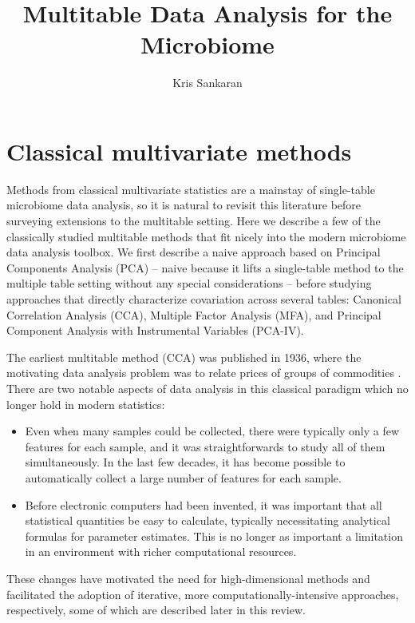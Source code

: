 \documentclass{article}
\title{Multitable Data Analysis for the Microbiome}
\author{Kris Sankaran}
\begin{document}
\maketitle

\section{Classical multivariate methods}

Methods from classical multivariate statistics are a mainstay
of single-table microbiome data analysis, so it is natural to revisit
this literature before surveying extensions to the multitable
setting. Here we describe a few of the classically studied multitable
methods that fit nicely into the modern microbiome data analysis
toolbox. We first describe a naive approach based on Principal
Components Analysis (PCA) -- naive because it lifts a single-table
method to the multiple table setting without any special
considerations --  before studying approaches that directly
characterize covariation across several tables: Canonical Correlation
Analysis (CCA), Multiple Factor Analysis (MFA), and Principal
Component Analysis with Instrumental Variables (PCA-IV).

The earliest multitable method (CCA) was published in 1936,
where the motivating data analysis problem was to relate prices of
groups of commodities \cite{hotelling1936relations}. There are two notable
aspects of data analysis in this classical paradigm which no longer
hold in modern statistics:
\begin{itemize}
  \item Even when many samples could be collected, there were
    typically only a few features for each sample, and it was
    straightforwards to study all of them simultaneously. In the last
    few decades, it has become possible to automatically collect a
    large number of features for each sample.
  \item Before electronic computers had been invented, it was
    important that all statistical quantities be easy to
    calculate, typically necessitating analytical formulas for
    parameter estimates. This is no longer as important a limitation
    in an environment with richer computational resources.
\end{itemize}

These changes have motivated the need for high-dimensional methods and
facilitated the adoption of iterative, more computationally-intensive
approaches, respectively, some of which are described later in this
review.
\end{document}
